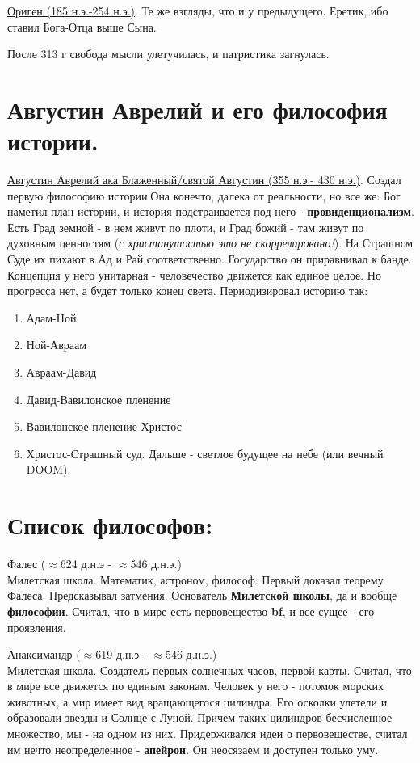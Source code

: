\documentclass[12pt,a4paper]{article}
\begin{document}
\underline{Ориген (185 н.э.-254 н.э.)}. Те же взгляды, что и у предыдущего. Еретик, ибо ставил Бога-Отца выше Сына.
 
После 313 г свобода мысли улетучилась, и патристика загнулась.

\section{Августин Аврелий и его философия истории.}

\underline{Августин Аврелий ака Блаженный/святой Августин (355 н.э.- 430 н.э.)}. Создал первую философию истории.Она конечто, далека от реальности, но все же: Бог наметил план истории, и история подстраивается под него - \textbf{провиденционализм}. Есть Град земной - в нем живут по плоти, и Град божий - там живут по духовным ценностям (\textit{с христанутостью это не скоррелировано!}). На Страшном Суде их пихают в Ад и Рай соответственно. Государство он приравнивал к банде. Концепция у него унитарная - человечество движется как единое целое. Но прогресса нет, а будет только конец света. Периодизировал историю так:
\begin{enumerate}
\item Адам-Ной
\item Ной-Авраам
\item Авраам-Давид
\item Давид-Вавилонское пленение
\item Вавилонское пленение-Христос
\item Христос-Страшный суд. Дальше - светлое будущее на небе (или вечный DOOM).
\end{enumerate}
\newpage

\section{Список философов:}
Фалес ($\approx$624 д.н.э - $\approx$546 д.н.э.)\\
Милетская школа. Математик, астроном, философ. Первый доказал теорему Фалеса. Предсказывал затмения. Основатель \textbf{Милетской школы}, да и вообще \textbf{философии}. Считал, что в мире есть первовещество \textbf{bf}, и все сущее - его проявления.

Анаксимандр ($\approx$619 д.н.э - $\approx$546 д.н.э.)\\
Милетская школа. Создатель первых солнечных часов, первой карты. Считал, что в мире все движется по единым законам. Человек у него - потомок морских животных, а мир имеет вид вращающегося цилиндра. Его осколки улетели и образовали звезды и Солнце с Луной. Причем таких цилиндров бесчисленное множество, мы - на одном из них. Придерживался идеи о первовеществе, считал им нечто неопределенное - \textbf{апейрон}. Он неосязаем и доступен только уму.
\end{document}
